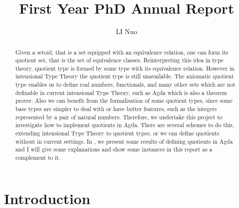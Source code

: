 \documentclass[envcountsame]{llncs}
\title{First Year PhD Annual Report}
\author{LI Nuo}
\institute{University of Nottingham}
\newcommand{\todo}[1]{\textcolor{red}{TO~DO:~#1}}
\newcommand{\itt}{intensional Type Theory}
\begin{document}
\maketitle


\tableofcontents

\newpage 

\begin{abstract}


Given a setoid, that is a set equipped with an equivalence relation, one can form its quotient set, that is the set of equivalence classes. %
Reinterpreting this idea in type theory, quotient type is formed by some type with its equivalence relation. However in \itt{}  the quotient type is still unavailable. The axiomatic quotient type enables us to define real numbers, functionals, and many other sets which are not definable in current \itt,  such as Agda which is also a theorem prover. Also we can benefit from the formalisation of some quotient types, since some base types are simpler to deal with or have better features, such as the integers represented by a pair of natural numbers.  Therefore, we undertake this project to investigate how to implement quotients in Agda. There are several schemes to do this, extending intensional Type Theory to quotient types, or we can define quotients without in current settings. In  \cite{aan}, we present some results of defining quotients in Agda and I will
give some explanations  and show some instances in this report as a complement to it.

\end{abstract}


\section{Introduction}
\end{document}
